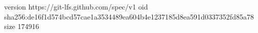 version https://git-lfs.github.com/spec/v1
oid sha256:de16f1d574bcd57cae1a3534489ea604b4e1237185d8ea591d0337352fd85a78
size 174916
